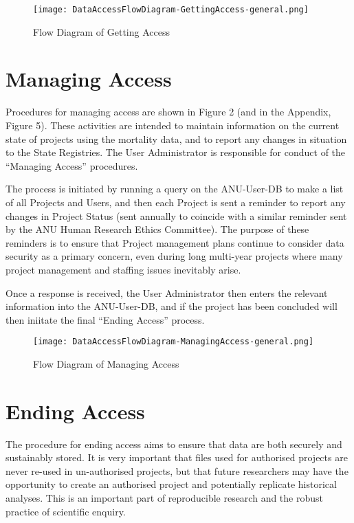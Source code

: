 \documentclass[a4paper]{article}
\begin{document}
\begin{figure}[!h]
\centering
\texttt{[image: DataAccessFlowDiagram-GettingAccess-general.png]}
\caption{Flow Diagram of Getting Access}
\label{fig:DataAccessFlowDiagram-GettingAccess}
\end{figure}
\clearpage
\section{Managing Access}
\label{sec-3}

Procedures for managing access are shown in Figure 2 (and in the Appendix, Figure 5). These activities are intended to maintain information on the current state of projects using the mortality data, and to report any changes in situation to the State Registries. The User Administrator is responsible for conduct of the ``Managing Access'' procedures.

The process is initiated by running a query on the ANU-User-DB to make a list of all Projects and Users, and then each Project is sent a reminder to report any changes in Project Status (sent annually to coincide with a similar reminder sent by the ANU Human Research Ethics Committee). The purpose of these reminders is to ensure that Project management plans continue to consider data security as a primary concern, even during long multi-year projects where many project management and staffing issues inevitably arise.

Once a response is received, the User Administrator then enters the relevant information into the ANU-User-DB, and if the project has been concluded will then iniitate the final ``Ending Access'' process.


\begin{figure}[!h]
\centering
\texttt{[image: DataAccessFlowDiagram-ManagingAccess-general.png]}
\caption{Flow Diagram of Managing Access}
\label{fig:DataAccessFlowDiagram-ManagingAccess}
\end{figure}
\clearpage
\section{Ending Access}
\label{sec-4}

The procedure for ending access aims to ensure that data are both securely and sustainably stored.  It is very important that files used for authorised projects are never re-used in un-authorised projects, but that future researchers may have the opportunity to create an authorised project and potentially replicate historical analyses.  This is an important part of reproducible research and the robust practice of scientific enquiry.
\end{document}
